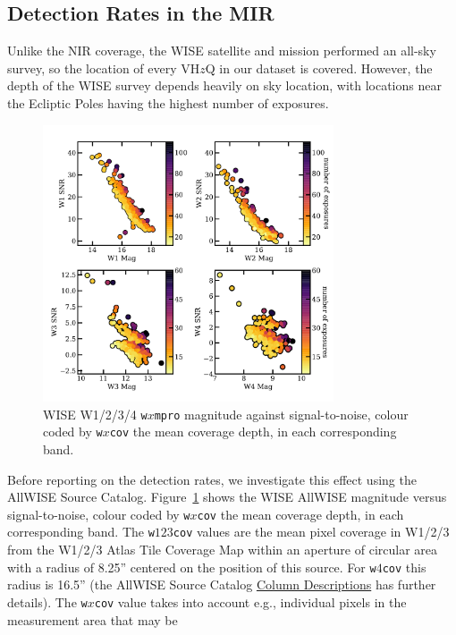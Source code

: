 \documentclass[usenatbib]{mnras}
\begin{document}
\subsection{Detection Rates in the MIR}
Unlike the NIR coverage, the WISE satellite and mission performed an all-sky survey, so the location of every VH$z$Q in our dataset is covered. However, the depth of the WISE survey depends heavily on sky location, with locations near the Ecliptic Poles having the highest number of exposures.

\begin{figure}
  \includegraphics[width=8.6cm, clip,trim=6mm 6mm 0mm 6mm]
  {../detections/WISEmag_vs_coverage_20190605.pdf}
  \centering
  \vspace{-14pt}
  \caption[]{WISE W1/2/3/4 {\tt w$x$mpro} magnitude against signal-to-noise,
    colour coded by {\tt w$x$cov} the mean coverage depth, in each corresponding band.}
  \label{fig:WISEmag_vs_coverage}
\end{figure}
Before reporting on the detection rates, we investigate this effect
using the AllWISE Source Catalog. Figure~\ref{fig:WISEmag_vs_coverage}
shows the WISE AllWISE magnitude versus signal-to-noise, colour coded
by {\tt w$x$cov} the mean coverage depth, in each corresponding
band. The {\tt w$123$cov} values are the mean pixel coverage in W1/2/3
from the W1/2/3 Atlas Tile Coverage Map within an aperture of circular
area with a radius of 8.25'' centered on the position of this
source. For {\tt w$4$cov} this radius is 16.5'' (the AllWISE Source
Catalog
\href{http://wise2.ipac.caltech.edu/docs/release/allwise/expsup/sec2_1a.html#w2cov}{Column
Descriptions} has further details). The {\tt w$x$cov} value takes into
account e.g., individual pixels in the measurement area that may be
\end{document}
